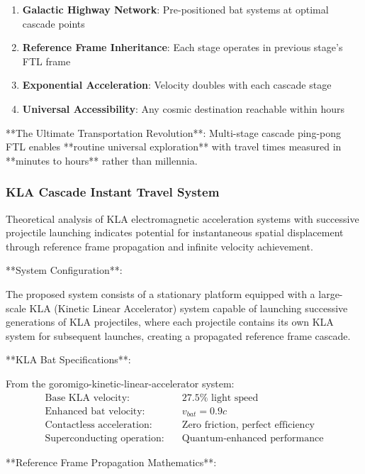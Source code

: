 \documentclass[12pt,a4paper]{article}
\theoremstyle{remark}
\begin{document}
\begin{enumerate}
\item \textbf{Galactic Highway Network}: Pre-positioned bat systems at optimal cascade points
\item \textbf{Reference Frame Inheritance}: Each stage operates in previous stage's FTL frame
\item \textbf{Exponential Acceleration}: Velocity doubles with each cascade stage
\item \textbf{Universal Accessibility}: Any cosmic destination reachable within hours
\end{enumerate}

**The Ultimate Transportation Revolution**: Multi-stage cascade ping-pong FTL enables **routine universal exploration** with travel times measured in **minutes to hours** rather than millennia.

\subsubsection{KLA Cascade Instant Travel System}

Theoretical analysis of KLA electromagnetic acceleration systems with successive projectile launching indicates potential for instantaneous spatial displacement through reference frame propagation and infinite velocity achievement.

**System Configuration**:

The proposed system consists of a stationary platform equipped with a large-scale KLA (Kinetic Linear Accelerator) system capable of launching successive generations of KLA projectiles, where each projectile contains its own KLA system for subsequent launches, creating a propagated reference frame cascade.

**KLA Bat Specifications**:

From the goromigo-kinetic-linear-accelerator system:
\begin{align}
\text{Base KLA velocity:} &\quad 27.5\% \text{ light speed} \\
\text{Enhanced bat velocity:} &\quad v_{bat} = 0.9c \\
\text{Contactless acceleration:} &\quad \text{Zero friction, perfect efficiency} \\
\text{Superconducting operation:} &\quad \text{Quantum-enhanced performance}
\end{align}

**Reference Frame Propagation Mathematics**:
\end{document}
